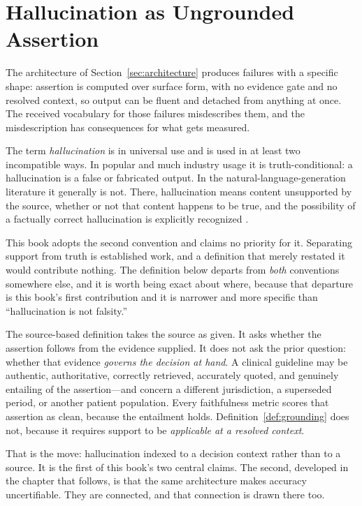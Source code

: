 \chapter{Hallucination as Ungrounded Assertion}
\label{ch:taxonomy}
\label{sec:taxonomy}

The architecture of Section~\ref{sec:architecture} produces failures with a specific
shape: assertion is computed over surface form, with no evidence gate and no resolved
context, so output can be fluent and detached from anything at once. The received
vocabulary for those failures misdescribes them, and the misdescription has consequences
for what gets measured.

The term \emph{hallucination} is in universal use and is used in at least two
incompatible ways. In popular and much industry usage it is truth-conditional: a
hallucination is a false or fabricated output. In the natural-language-generation
literature it generally is not. There, hallucination means content unsupported by
the source, whether or not that content happens to be true, and the possibility of a
factually correct hallucination is explicitly recognized
\citep{maynez2020,ji2023}.

This book adopts the second convention and claims no priority for it. Separating
support from truth is established work, and a definition that merely restated it
would contribute nothing. The definition below departs from \emph{both} conventions
somewhere else, and it is worth being exact about where, because that departure is
this book's first contribution and it is narrower and more specific than
``hallucination is not falsity.''

The source-based definition takes the source as given. It asks whether the assertion
follows from the evidence supplied. It does not ask the prior question: whether that
evidence \emph{governs the decision at hand}. A clinical guideline may be authentic,
authoritative, correctly retrieved, accurately quoted, and genuinely entailing of the
assertion---and concern a different jurisdiction, a superseded period, or another
patient population. Every faithfulness metric scores that assertion as clean, because
the entailment holds. Definition~\ref{def:grounding} does not, because it requires
support to be \emph{applicable at a resolved context}.

That is the move: hallucination indexed to a decision context rather than to a
source. It is the first of this book's two central claims. The second, developed in the
chapter that follows, is that the same architecture makes accuracy
uncertifiable. They are connected, and that connection is drawn there too.

